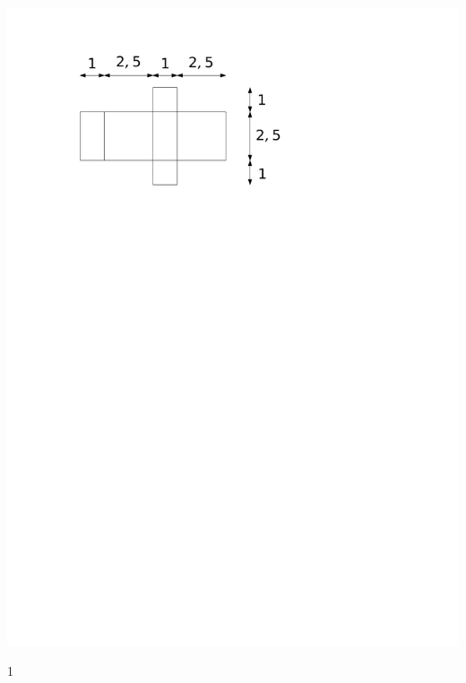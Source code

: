 \documentclass[a4paper,11pt]{report}
\begin{document}
\begin{exo}
{\begin{tasks}
    \task ~\\ \includegraphics[scale=0.5]{media/gm-02/pave2-2.pdf}
\end{tasks}
}{1}   
\end{exo}
\end{document}
